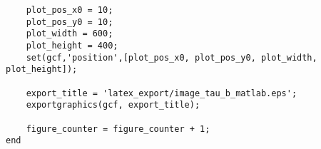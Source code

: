 \begin{lstlisting}
    plot_pos_x0 = 10;
    plot_pos_y0 = 10;
    plot_width = 600;
    plot_height = 400;
    set(gcf,'position',[plot_pos_x0, plot_pos_y0, plot_width, plot_height]);
    
    export_title = 'latex_export/image_tau_b_matlab.eps';
    exportgraphics(gcf, export_title);
    
    figure_counter = figure_counter + 1;
end
\end{lstlisting}